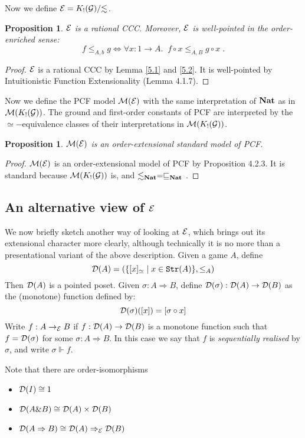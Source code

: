 \documentclass[11pt]{article}
\newtheorem{proposition}[theorem]{Proposition}
\newcommand{\E}{{\cal E}}
\newcommand{\M}{{\cal M}}
\newcommand{\D}{{\cal D}}
\newcommand{\Ip}[1]{\lesssim_{#1}}
\newcommand{\Nat}{{\bf Nat}}
\newcommand{\with}{\mbox{$\&$}}
\newcommand{\Sx}{\sqsubseteq}
\begin{document}
Now we define $\E=K_{!}({\cal G})/{\Ip{}}$.

\begin{proposition}\label{5.3}
$\E$ is a rational CCC. Moreover, $\E$ is well-pointed in the
order-enriched sense:
$$f\leq_{A,b}g\Leftrightarrow\forall x:1\rightarrow A. \;\; f\circ x\leq_{A,B}
g\circ x\; .$$
\end{proposition}
\begin{proof} $\E$ is a rational CCC by Lemma \ref{5.1} and
\ref{5.2}. It is well-pointed by Intuitionistic Function
Extensionality (Lemma 4.1.7).
\end{proof}



Now we define the PCF model $\M(\E)$ with the same interpretation
of $\Nat$ as in $\M(K_{!}({\cal G}))$. The ground and first-order
constants of PCF are interpreted by the $\simeq-$equivalence
classes of their interpretations in $\M(K_{!}({\cal G}))$.

\begin{proposition}\label{5.4}
$\M(\E)$ is an order-extensional standard model of PCF.
\end{proposition}
\begin{proof} $\M(\E)$ is an order-extensional model of PCF by
Proposition 4.2.3. It is standard because $\M(K_{!}({\cal G}))$
is, and $\Ip{\Nat}=\Sx_{\Nat}$ .
\end{proof}

\subsection{An alternative view of $\E$}
We now briefly sketch another way of looking
at $\E$, which brings out its extensional character more clearly,
although technically it is no more than a presentational variant of the
above description.
Given a game $A$, define
$$\D(A)=(\{ [x]_{\simeq}\mid x\in{\tt Str}(A)\},\leq_A)$$
Then $\D(A)$ is a pointed poset. Given $\sigma:A\Rightarrow B$, define
$\D(\sigma):\D(A)\rightarrow \D(B)$ as the (monotone) function defined by:
$$\D(\sigma)([x])=[\sigma\circ x]$$
Write $f:A\rightarrow_{\E} B$ if $f:\D(A)\rightarrow \D(B)$ is a monotone
function such that $f=\D(\sigma)$ for some $\sigma: A\Rightarrow B$. In this
case we say that $f$ is {\em sequentially realised} by $\sigma$, and write
$\sigma\Vdash f$.

Note that there are order-isomorphisms

\begin{itemize}
\item $\D(I)\cong 1$
\item $\D(A\with B)\cong \D(A)\times\D(B)$
\item $\D(A\Rightarrow B)\cong \D(A)\Rightarrow_{\E}\D(B)$
\end{itemize}
\end{document}
